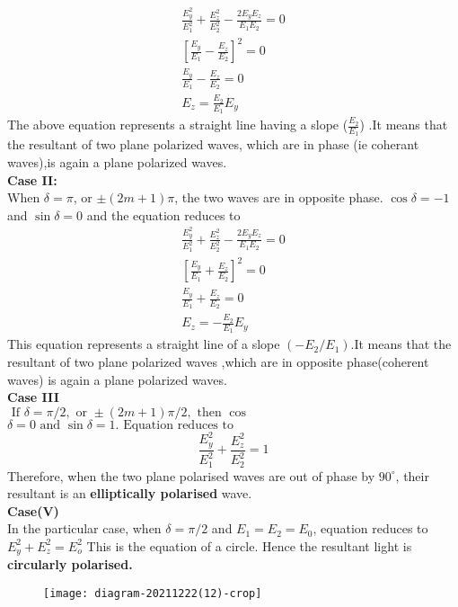 $$
\begin{gathered}
\frac{E_{y}^{2}}{E_{1}^{2}}+\frac{E_{z}^{2}}{E_{2}^{2}}-\frac{2 E_{y} E_{z}}{E_{1} E_{2}}=0 \\
{\left[\frac{E_{y}}{E_{1}}-\frac{E_{z}}{E_{2}}\right]^{2}=0} \\
\frac{E_{y}}{E_{1}}-\frac{E_{z}}{E_{2}}=0 \\
E_{z}=\frac{E_{2}}{E_{1}} E_{y}
\end{gathered}
$$
 The above equation represents a straight line having a slope ($\frac{E_2}{E_1}$) .It means that the resultant of two plane polarized waves, which are in phase (ie coherant waves),is again a plane polarized waves.\\
 \textbf{Case II:} \\
 When $\delta=\pi$, or $\pm(2 m+1) \pi$, the two waves are in opposite phase. $\cos \delta=-1$ and $\sin \delta=0$ and the equation reduces to
 $$
 \begin{gathered}
 \frac{E_{y}^{2}}{E_{1}^{2}}+\frac{E_{z}^{2}}{E_{2}^{2}}-\frac{2 E_{y} E_{z}}{E_{1} E_{2}}=0 \\
 {\left[\frac{E_{y}}{E_{1}}+\frac{E_{z}}{E_{2}}\right]^{2}=0} \\
 \frac{E_{y}}{E_{1}}+\frac{E_{z}}{E_{2}}=0 \\
 E_{z}=-\frac{E_{2}}{E_{1}} E_{y}
 \end{gathered}
 $$
 This equation represents a straight line of a slope $\left(-E_{2} / E_{1}\right)$.It means that the resultant of two plane polarized waves ,which are in opposite phase(coherent waves) is again a plane polarized waves.\\
 \textbf{Case III}\\
 $\text { If } \delta=\pi / 2, \text { or } \pm(2 m+1) \pi / 2, \text { then } \cos $$\delta=0 \text { and } \sin \delta=1 . \text { Equation} \text { reduces to }$
 $$\frac{E_{y}^{2}}{E_{1}^{2}}+\frac{E_{z}^{2}}{E_{2}^{2}}=1$$
  Therefore, when the two plane polarised waves are out of phase by $90^{\circ}$, their resultant is an \textbf{elliptically polarised} wave.\\
  \textbf{Case(V)}\\
   In the particular case, when $\delta=\pi / 2$ and $E_{1}=E_{2}=E_{0}$, equation reduces to $E_{y}^{2}+E_{z}^{2}=E_{o}^{2}$
  This is the equation of a circle. Hence the resultant light is \textbf{circularly polarised.
  }\\
 
\begin{figure}[H]
 	\centering
 	\texttt{[image: diagram-20211222(12)-crop]}
 	\caption{}
 	\label{}
 \end{figure}
 
